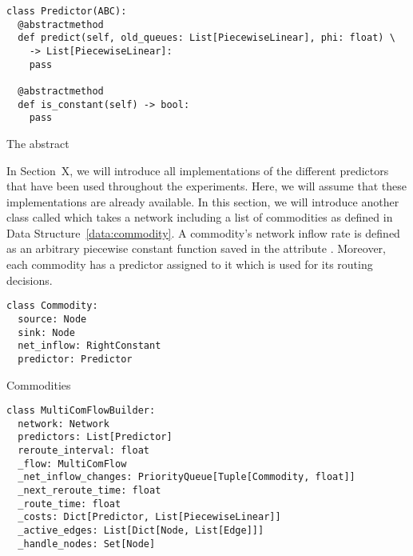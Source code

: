 \begin{classdef}
  \begin{verbatim}
class Predictor(ABC):
  @abstractmethod
  def predict(self, old_queues: List[PiecewiseLinear], phi: float) \
    -> List[PiecewiseLinear]:
    pass
  
  @abstractmethod
  def is_constant(self) -> bool:
    pass
\end{verbatim}
\caption{The abstract }
\label{data:predictor}
\end{classdef}


In Section~X, we will introduce all implementations of the different predictors that have been used throughout the experiments.
Here, we will assume that these implementations are already available.
In this section, we will introduce another class called  which takes a network including a list of commodities as defined in Data Structure~\ref{data:commodity}.
A commodity's network inflow rate is defined as an arbitrary piecewise constant function saved in the attribute \code{net_inflow}. 
Moreover, each commodity has a predictor assigned to it which is used for its routing decisions.

\begin{classdef}
    \begin{verbatim}
class Commodity:
  source: Node
  sink: Node
  net_inflow: RightConstant
  predictor: Predictor
\end{verbatim}
\caption{Commodities}%
\label{data:commodity}
\end{classdef}



\begin{classdef}
  \begin{verbatim}      
class MultiComFlowBuilder:
  network: Network
  predictors: List[Predictor]
  reroute_interval: float
  _flow: MultiComFlow
  _net_inflow_changes: PriorityQueue[Tuple[Commodity, float]]
  _next_reroute_time: float
  _route_time: float
  _costs: Dict[Predictor, List[PiecewiseLinear]]
  _active_edges: List[Dict[Node, List[Edge]]]
  _handle_nodes: Set[Node]
\end{verbatim}
    \caption{}%
    \label{data:multi-com-flow-builder}
\end{classdef}

